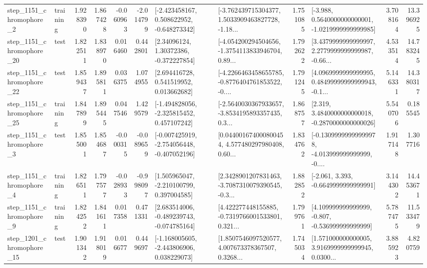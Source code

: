 \begin{tabular}{llrrrrllrlrr}
  step\_1151\_chromophore\_2 &  training &      1.928390 &    1.867428 &     -0.060963 & -2.014799 &   [-2.423458167, 0.508622952, -0.648273342] &  [-3.762439715304377, 1.5033909463827728, -1.18... &       1.751085 &  [-3.988, 0.5640000000000001, -1.0219999999999985] &            3.708164 &         13.396925 \\
 step\_1151\_chromophore\_20 &      test &      1.822511 &    1.838970 &      0.016460 &  0.442801 &      [2.34096124, 1.30372386, -0.372227854] &  [-4.054200294504656, -1.3754113833946704, 0.89... &       1.792622 &  [3.4379999999999997, 2.2779999999999987, -0.66... &            4.533514 &         14.783245 \\
 step\_1151\_chromophore\_22 &      test &      1.859437 &    1.895811 &      0.036375 &  1.074955 &     [2.694416728, 0.541519952, 0.013662682] &  [-4.2266463458655785, -0.8776404761853522, -0.... &       1.791245 &  [4.0969999999999995, 0.48499999999999943, -0.1... &            5.146331 &         14.380317 \\
 step\_1151\_chromophore\_25 &  training &      1.847899 &    1.895445 &      0.047546 &  1.429579 &   [-1.494828056, -2.325815452, 0.457107242] &  [-2.5640030367933657, -3.8534195893357435, 0.3... &       1.868757 &   [2.319, 3.4840000000000018, -0.2870000000000026] &            5.540706 &          0.185545 \\
  step\_1151\_chromophore\_3 &      test &      1.855001 &    1.854687 &     -0.000315 & -0.089659 &  [-0.007425919, -2.754056448, -0.407052196] &  [0.044001674000800454, 4.577480297980408, 0.60... &       1.834762 &  [-0.13099999999999978, -4.013999999999999, -0.... &            1.917148 &          1.307716 \\
  step\_1151\_chromophore\_4 &  training &      1.826511 &    1.797577 &     -0.028933 & -0.998097 &    [1.505965047, -2.210100799, 0.397004585] &  [2.3428901207831463, -3.7087310079390545, -0.3... &       1.882852 &               [-2.061, 3.393, -0.6649999999999991] &            3.144302 &         14.453671 \\
  step\_1151\_chromophore\_9 &  training &      1.824252 &    1.841611 &      0.017358 &  0.471331 &   [2.683514006, -0.489239743, -0.074785164] &  [4.422277448155885, -0.7319766001533801, 0.321... &       1.799761 &    [4.109999999999999, -0.807, -0.536999999999999] &            5.787475 &         11.533479 \\
 step\_1201\_chromophore\_15 &      test &      1.901342 &    1.918019 &      0.016677 &  0.449697 &   [-1.168005605, -2.443806906, 0.038229073] &  [1.8507546097520577, 4.007673378367507, 0.3268... &       1.745034 &  [1.571000000000005, 3.9169999999999945, 0.0300... &            3.885923 &          4.820759 \\

\end{tabular}

